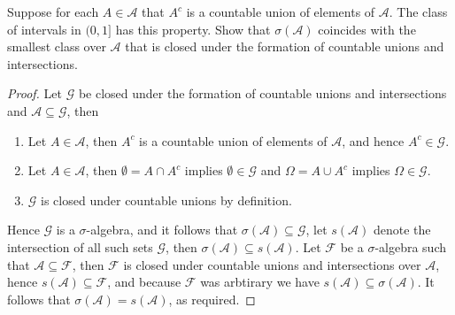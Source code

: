 \documentclass[12pt]{article}
\newcommand{\F}{\mathcal{F}}
\newcommand{\A}{\mathcal{A}}
\newcommand{\G}{\mathcal{G}}
\newcommand{\seq}{\subseteq}
\newcommand{\Om}{\Omega}
\newcommand{\es}{\emptyset}
\newcommand{\un}{\cup}
\newcommand{\ic}{\cap}
\newenvironment{exercise}[2][Exercise]{\begin{trivlist}
\item[\hskip \labelsep {\bfseries #1}\hskip \labelsep {\bfseries #2.}]}{\end{trivlist}}
\begin{document}
\begin{exercise}{2.8}
    Suppose for each $A \in \A$ that $A^{c}$ is a countable union of elements of $\A$. The class of intervals in $(0, 1]$ has this property. Show that $\sigma (\A)$ coincides with the smallest class over $\A$ that is closed under the formation of countable unions and intersections.
\end{exercise}
\begin{proof}
    Let $\G$ be closed under the formation of countable unions and intersections and $\A \seq \G$, then
    \begin{enumerate}
        \item Let $A \in \A$, then $A^{c}$ is a countable union of elements of $\A$, and hence $A^{c} \in \G$.
        \item Let $A \in \A$, then $\es = A \ic A^{c}$ implies $\es \in \G$ and $\Om = A \un A^{c}$ implies $\Om \in \G$.
        \item $\G$ is closed under countable unions by definition.
    \end{enumerate}
    Hence $\G$ is a $\sigma$-algebra, and it follows that $\sigma (\A) \seq \G$, let $s(\A)$ denote the intersection of all such sets $\G$, then $\sigma (\A) \seq s(\A)$. Let $\F$ be a $\sigma$-algebra such that $\A \seq \F$, then $\F$ is closed under countable unions and intersections over $\A$, hence $s(\A) \seq \F$, and because $\F$ was arbtirary we have $s(\A) \seq \sigma(\A)$. It follows that $\sigma (\A) = s(\A)$, as required.
\end{proof}
\end{document}
